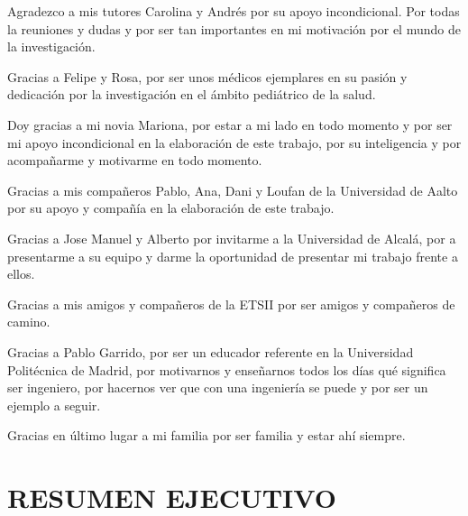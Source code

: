 \documentclass[a4paper, 11pt, spanish, twoside]{article}
\begin{document}
Agradezco a mis tutores Carolina y Andrés por su apoyo incondicional. Por todas la reuniones y dudas y por ser tan importantes en mi motivación por el mundo de la investigación.  

Gracias a Felipe y Rosa, por ser unos médicos ejemplares en su pasión y dedicación por la investigación en el ámbito pediátrico de la salud.

Doy gracias a mi novia Mariona, por estar a mi lado en todo momento y por ser mi apoyo incondicional en la elaboración de este trabajo, por su inteligencia y por acompañarme y motivarme en todo momento. 

Gracias a mis compañeros Pablo, Ana, Dani y Loufan de la Universidad de Aalto por su apoyo y compañía en la elaboración de este trabajo. 

Gracias a Jose Manuel y Alberto por invitarme a la Universidad de Alcalá, por a presentarme a su equipo y darme la oportunidad de presentar mi trabajo frente a ellos.

Gracias a mis amigos y compañeros de la ETSII por ser amigos y compañeros de camino.

Gracias a Pablo Garrido, por ser un educador referente en la Universidad Politécnica de Madrid, por motivarnos y enseñarnos todos los días qué significa ser ingeniero, por hacernos ver que con una ingeniería se puede y por ser un ejemplo a seguir.

Gracias en último lugar a mi familia por ser familia y estar ahí siempre.

\newpage



\section*{RESUMEN EJECUTIVO} %
\end{document}
